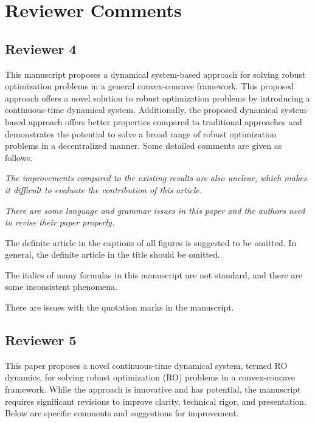 \documentclass[journal,twoside,web]{ieeecolor}
\begin{document}
\onecolumn

\section*{Reviewer Comments}

\subsection*{Reviewer 4}

This manuscript proposes a dynamical system-based approach for solving robust optimization problems in a general convex-concave framework. This proposed approach offers a novel solution to robust optimization problems by introducing a continuous-time dynamical system. Additionally, the proposed dynamical system-based approach offers better properties compared to traditional approaches and demonstrates the potential to solve a broad range of robust optimization problems in a decentralized manner. Some detailed comments are given as follows.

\textcolor{reviewerred}{\textit{The improvements compared to the existing results are also unclear, which makes it difficult to evaluate the contribution of this article.}}

\textcolor{reviewerred}{\textit{There are some language and grammar issues in this paper and the authors need to revise their paper properly.}}

The definite article in the captions of all figures is suggested to be omitted. In general, the definite article in the title should be omitted.

The italics of many formulas in this manuscript are not standard, and there are some inconsistent phenomena.

There are issues with the quotation marks in the manuscript.

\subsection*{Reviewer 5}

This paper proposes a novel continuous-time dynamical system, termed RO dynamics, for solving robust optimization (RO) problems in a convex-concave framework. While the approach is innovative and has potential, the manuscript requires significant revisions to improve clarity, technical rigor, and presentation. Below are specific comments and suggestions for improvement.
\end{document}
